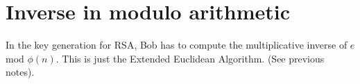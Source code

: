 \section{Inverse in modulo arithmetic}

In the key generation for RSA, Bob has to compute the
multiplicative inverse of $e$ mod $\phi(n)$. This is just the
Extended Euclidean Algorithm. (See previous notes).
